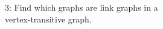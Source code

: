 \documentclass[preview]{standalone}
\begin{document}
\begin{center}
3: Find which graphs are link graphs in a \\ \phantom{3: }vertex-transitive graph.
\end{center}
\end{document}
